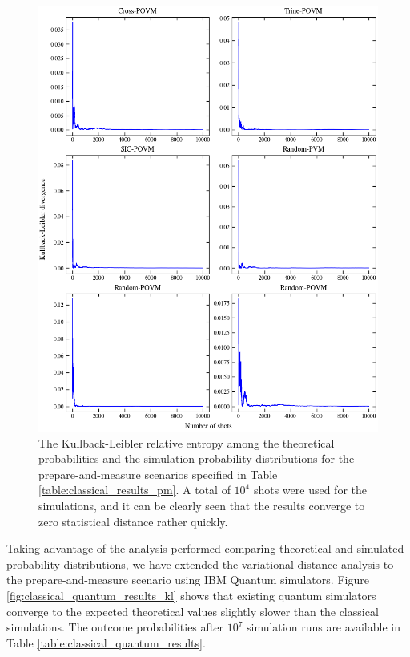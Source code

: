 \begin{figure}[h!]
\centering
\includegraphics[width=\textwidth]{images/pm_povm_kl.png}
\caption{The Kullback-Leibler relative entropy among the theoretical probabilities and the simulation probability distributions for the prepare-and-measure scenarios specified in Table \ref{table:classical_results_pm}. A total of $10^4$ shots were used for the simulations, and it can be clearly seen that the results converge to zero statistical distance rather quickly.}
\label{fig:classical_results_kl}
\end{figure}

Taking advantage of the analysis performed comparing theoretical and simulated probability distributions, we have extended the variational distance analysis to the prepare-and-measure scenario using IBM Quantum simulators. Figure \ref{fig:classical_quantum_results_kl} shows that existing quantum simulators converge to the expected theoretical values slightly slower than the classical simulations. The outcome probabilities after $10^7$ simulation runs are available in Table \ref{table:classical_quantum_results}.

